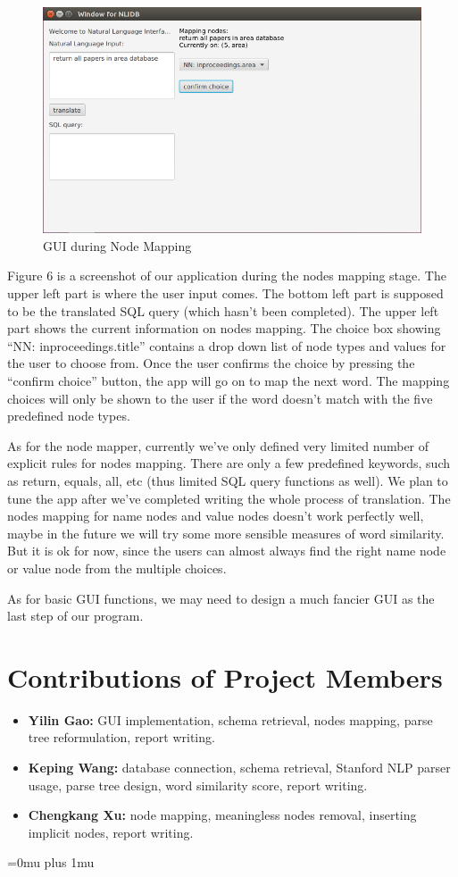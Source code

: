 \documentclass[twocolumn]{article}
\begin{document}
\begin{figure}[ht]
  \centering
  \includegraphics[width=0.7\linewidth]{figures/gui_nodes_mapping.png}
  \caption{GUI during Node Mapping}
\end{figure}

Figure 6 is a screenshot of our application during the nodes mapping stage. The upper left part is where the user input comes. The bottom left part is supposed to be the translated SQL query (which hasn’t been completed). The upper left part shows the current information on nodes mapping. The choice box showing “NN: inproceedings.title” contains a drop down list of node types and values for the user to choose from. Once the user confirms the choice by pressing the “confirm choice” button, the app will go on to map the next word. The mapping choices will only be shown to the user if the word doesn’t match with the five predefined node types.

As for the node mapper, currently we’ve only defined very limited number of explicit rules for nodes mapping. There are only a few predefined keywords, such as return, equals, all, etc (thus limited SQL query functions as well). We plan to tune the app after we’ve completed writing the whole process of translation. The nodes mapping for name nodes and value nodes doesn’t work perfectly well, maybe in the future we will try some more sensible measures of word similarity. But it is ok for now, since the users can almost always find the right name node or value node from the multiple choices. 

As for basic GUI functions, we may need to design a much fancier GUI as the last step of our program.

\section{Contributions of Project Members}

\begin{itemize}
\item {\bf Yilin Gao:} GUI implementation, schema retrieval, nodes mapping, parse tree reformulation, report writing.
\item {\bf Keping Wang:} database connection, schema retrieval, Stanford NLP parser usage, parse tree design, word similarity score, report writing.
\item {\bf Chengkang Xu:} node mapping, meaningless nodes removal, inserting implicit nodes, report writing.
\end{itemize}


\Urlmuskip=0mu plus 1mu\relax


\end{document}
